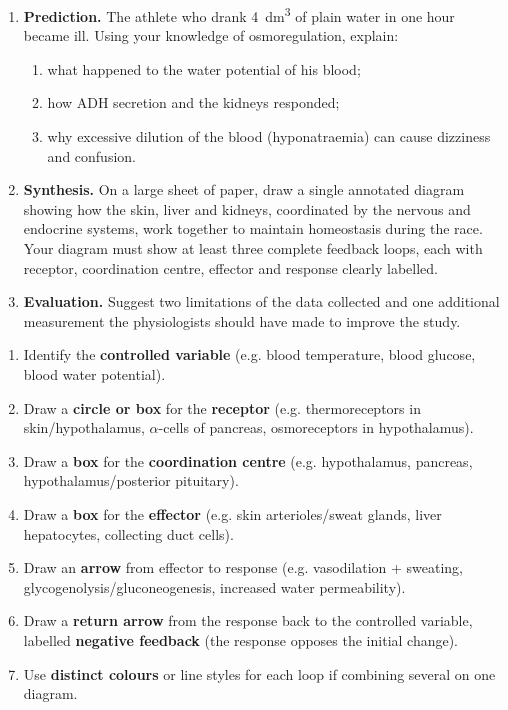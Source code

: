 \documentclass[11pt]{article}
\newcommand{\cle}[1]{{\popxbold\color{popdark}#1}}
\begin{document}
\begin{enumerate}
\item \textbf{Prediction.} The athlete who drank \SI{4}{dm^{3}} of plain water in one hour became ill. Using your knowledge of osmoregulation, explain:
\begin{enumerate}
\item what happened to the water potential of his blood;
\item how ADH secretion and the kidneys responded;
\item why excessive dilution of the blood (hyponatraemia) can cause dizziness and confusion.
\end{enumerate}

\item \textbf{Synthesis.} On a large sheet of paper, draw a single annotated diagram showing how the \cle{skin}, \cle{liver} and \cle{kidneys}, coordinated by the nervous and endocrine systems, work together to maintain homeostasis during the race. Your diagram must show at least three complete feedback loops, each with receptor, coordination centre, effector and response clearly labelled.

\item \textbf{Evaluation.} Suggest two limitations of the data collected and one additional measurement the physiologists should have made to improve the study.
\end{enumerate}

\begin{methode}
\begin{enumerate}
\item Identify the \textbf{controlled variable} (e.g. blood temperature, blood glucose, blood water potential).
\item Draw a \textbf{circle or box} for the \textbf{receptor} (e.g. thermoreceptors in skin/hypothalamus, $\alpha$-cells of pancreas, osmoreceptors in hypothalamus).
\item Draw a \textbf{box} for the \textbf{coordination centre} (e.g. hypothalamus, pancreas, hypothalamus/posterior pituitary).
\item Draw a \textbf{box} for the \textbf{effector} (e.g. skin arterioles/sweat glands, liver hepatocytes, collecting duct cells).
\item Draw an \textbf{arrow} from effector to response (e.g. vasodilation + sweating, glycogenolysis/gluconeogenesis, increased water permeability).
\item Draw a \textbf{return arrow} from the response back to the controlled variable, labelled \textbf{negative feedback} (the response opposes the initial change).
\item Use \textbf{distinct colours} or line styles for each loop if combining several on one diagram.
\end{enumerate}
\end{methode}
\end{document}
